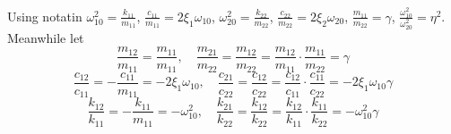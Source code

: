 \documentclass{article}
\begin{document}
	Using notatin $\omega_{10}^2=\frac{k_{11}}{m_{11}}$, $ \frac{c_{11}}{m_{11}}=2\xi_1 \omega_{10} $, $\omega_{20}^2= \frac{k_{22}}{m_{22}}$, $\frac{c_{22}}{m_{22}}= 2 \xi_2 \omega_{20}$, $ \boxed{ \frac{m_{11}}{m_{22}}= \gamma }$, $\boxed { \frac{\omega_{10}^2}{\omega_{20}^2}= \eta^2 }$. Meanwhile let 
	$$ 
	 \frac{m_{12}}{m_{11}}=  \frac{m_{11}}{m_{11}}, \quad \frac{m_{21}}{m_{22}}= \frac{m_{12}}{m_{22}}= \frac{m_{12}}{m_{11}} \cdot \frac{m_{11}}{m_{22}} = \gamma 
	$$
	$$ 
	 \frac{c_{12}}{c_{11}}= - \frac{c_{11}}{m_{11}}=- 2 \xi_1 \omega_{10}, \quad \frac{c_{21}}{c_{22}}= \frac{c_{12}}{c_{22}}= \frac{c_{12}}{c_{11}} \cdot \frac{c_{11}}{c_{22}} = - 2 \xi_1 \omega_{10}\gamma
	$$
	$$ 
	 \frac{k_{12}}{k_{11}} =- \frac{k_{11}}{m_{11}}=-\omega_{10}^2, \quad \frac{k_{21}}{k_{22}}= \frac{k_{12}}{k_{22}}= \frac{k_{12}}{k_{11}} \cdot \frac{k_{11}}{k_{22}} =-\omega_{10}^2 \gamma
	$$
	
\end{document}
